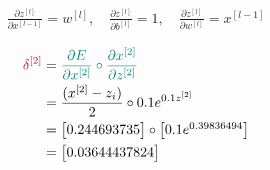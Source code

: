 \documentclass[12pt]{article}
\begin{document}
\begin{enumerate}[leftmargin=\labelsep]
        \begin{equation*}
          \begin{aligned}
            \frac{\partial z^{[l]}}{\partial x^{[l - 1]}} = w^{[l]}, \quad
            \frac{\partial z^{[l]}}{\partial b^{[l]}} = 1, \quad
            \frac{\partial z^{[l]}}{\partial w^{[l]}} = x^{[l - 1]}
          \end{aligned}
        \end{equation*}

        \begin{multicols}{2}
          \setlength{\columnseprule}{1pt}
          \def\columnseprulecolor{\color{black}}
          \centering

          \begin{equation*}
            \begin{aligned}
              \textcolor{purple}{\delta^{[2]}} & = \textcolor{teal}{\frac{\partial E}{\partial x^{[2]}} \circ
              \frac{\partial x^{[2]}}{\partial z^{[2]}}}                                                               \\
                                               & = \frac{(x^{[2]} - z_i)}{2} \circ 0.1e^{0.1z^{[2]}}                   \\
                                               & = \begin{bmatrix}
                                                     0.244693735
                                                   \end{bmatrix} \circ \begin{bmatrix} 0.1e^{0.39836494} \end{bmatrix} \\
                                               & = \begin{bmatrix}
                                                     0.03644437824
                                                   \end{bmatrix}
            \end{aligned}
          \end{equation*}

          \columnbreak


\end{multicols}
\end{enumerate}
\end{document}
